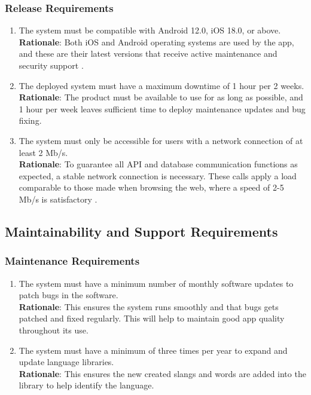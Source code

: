 \subsubsection{Release Requirements}
\label{ssub:release_requirements}
\begin{enumerate}[{OE-R}1. ]
	\item The system must be compatible with Android 12.0, iOS 18.0, or above.
	\\ \textbf{Rationale}: Both iOS and Android operating systems are used by the app, and these are their latest versions that receive active maintenance and security support \cite{EndOfLife2025_Android,EndOfLife2025_iOS}. 
	\item The deployed system must have a maximum downtime of 1 hour per 2 weeks.
	\\ \textbf{Rationale}: The product must be available to use for as long as possible, and 1 hour per week leaves sufficient time to deploy maintenance updates and bug fixing.
	\item The system must only be accessible for users with a network connection of at least 2 Mb/s.
	\\ \textbf{Rationale}: To guarantee all API and database communication functions as expected, a stable network connection is necessary. These calls apply a load comparable to those made when browsing the web, where a speed of 2-5 Mb/s is satisfactory \cite{Speedtest2025}.
\end{enumerate}


\subsection{Maintainability and Support Requirements}
\label{sub:maintainability_and_support_requirements}

\subsubsection{Maintenance Requirements}
\label{ssub:maintenance_requirements}
\begin{enumerate}[{MS-M}1. ]
	\item The system must have a minimum number of monthly software updates to patch bugs in the software.  
	\\ \textbf{Rationale}: This ensures the system runs smoothly and that bugs gets patched and fixed regularly. This will help to maintain 	good app quality throughout its use.
	\item The system must have a minimum of three times per year to expand and update language libraries. 
	\\ \textbf{Rationale}: This ensures the new created slangs and words are added into the library to help identify the language.
\end{enumerate}

